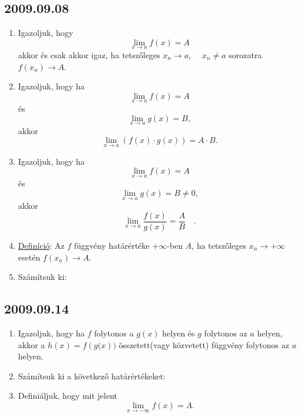 \subsection*{2009.09.08}
\begin{enumerate}
\item Igazoljuk, hogy
$$\lim_{x\to a}f(x)=A$$akkor és csak akkor igaz, ha tetszőleges $x_n\to a$,$\quad $ $x_n\not =a$ sorozatra $f(x_n)\to A$.
\item Igazoljuk, hogy ha $$\lim_{x\to a}f(x)=A$$ és $$\lim_{x\to a}g(x)=B,$$ akkor $$\lim_{x\to a}\left(f(x)\cdot g(x)\right)=A\cdot B.$$ 
\item Igazoljuk, hogy ha $$\lim_{x\to a}f(x)=A$$és$$\lim_{x\to a}g(x)=B\not =0,$$ akkor $$\lim_{x\to a}\frac{f(x)}{g(x)}=\frac{A}{B}\quad.$$
\item \underline{Definíció}: Az $f$ függvény határértéke $+\infty$-ben $A$, ha tetszőleges $x_n\to +\infty$ esetén $f(x_n)\to A$.
\item Számítsuk ki:
\end{enumerate}
\subsection*{2009.09.14}
\begin{enumerate}
\item Igazoljuk, hogy ha $f$ folytonos a $g(x)$ helyen és $g$ folytonos az $a$ helyen, akkor a $h(x)=f\left(g(x\right))$ összetett(vagy közvetett) függvény folytonos az $a$ helyen.
\item Számítsuk ki a következő határértékeket:
\item Definiáljuk, hogy mit jelent $$\lim_{x\to -\infty}f(x)=A.$$
\end{enumerate}
